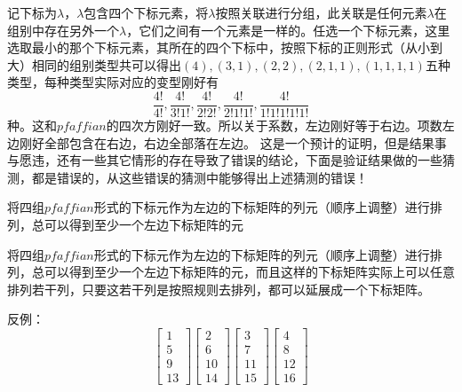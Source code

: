 \documentclass[twoside,a4paper,CCT]{cctart}   %
\begin{document}
记下标为${\lambda}$，$\lambda$包含四个下标元素，将${\lambda}$按照关联进行分组，此关联是任何元素$\lambda$在组别中存在另外一个$\lambda$，它们之间有一个元素是一样的。任选一个下标元素，这里选取最小的那个下标元素，其所在的四个下标中，按照下标的正则形式（从小到大）相同的组别类型共可以得出$(4),(3,1),(2,2),(2,1,1),(1,1,1,1)$五种类型，每种类型实际对应的变型刚好有$$\frac{4!}{4!},\frac{4!}{3!1!},\frac{4!}{2!2!},\frac{4!}{2!1!1!},\frac{4!}{1!1!1!1!1!}$$种。这和$pfaffian$的四次方刚好一致。所以关于系数，左边刚好等于右边。项数左边刚好全部包含在右边，右边全部落在左边。
这是一个预计的证明，但是结果事与愿违，还有一些其它情形的存在导致了错误的结论，下面是验证结果做的一些猜测，都是错误的，从这些错误的猜测中能够得出上述猜测的错误！
\begin{guess}
将四组$pfaffian$形式的下标元作为左边的下标矩阵的列元（顺序上调整）进行排列，总可以得到至少一个左边下标矩阵的元
\end{guess}
\begin{guess}
将四组$pfaffian$形式的下标元作为左边的下标矩阵的列元（顺序上调整）进行排列，总可以得到至少一个左边下标矩阵的元，而且这样的下标矩阵实际上可以任意排列若干列，只要这若干列是按照规则去排列，都可以延展成一个下标矩阵。
\end{guess}
反例：
\begin{equation}\begin{bmatrix}1\\5\\9\\13 \end{bmatrix}
\begin{bmatrix}2\\6\\10\\14 \end{bmatrix}
\begin{bmatrix}3\\7\\11\\15 \end{bmatrix}
\begin{bmatrix}4\\8\\12\\16 \end{bmatrix}\end{equation}
\end{document}
